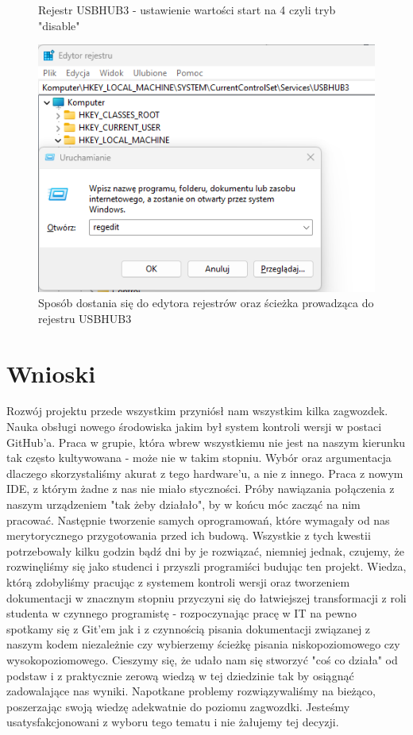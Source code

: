 \documentclass{article}
\begin{document}
\begin{itemize}
\begin{figure}[h]
    \caption{Rejestr USBHUB3 - ustawienie wartości start na 4 czyli tryb "disable"}
    \label{fig:enter-label}
    \end{figure}
    \begin{figure}[h]
    \centering
    \includegraphics[scale=0.5]{Media/Rejestr1.png}
    \caption{Sposób dostania się do edytora rejestrów oraz ścieżka prowadząca do rejestru USBHUB3}
    \label{fig:enter-label}
    \end{figure}
    \end{itemize} 
    
        

\section{Wnioski}
    Rozwój projektu przede wszystkim przyniósł nam wszystkim kilka zagwozdek. Nauka obsługi nowego środowiska jakim był system kontroli wersji w postaci GitHub'a. Praca w grupie, która wbrew wszystkiemu nie jest na naszym kierunku tak często kultywowana - może nie w takim stopniu. Wybór oraz argumentacja dlaczego skorzystaliśmy akurat z tego hardware'u, a nie z innego. Praca z nowym IDE, z którym żadne z nas nie miało styczności. Próby nawiązania połączenia z naszym urządzeniem "tak żeby działało", by w końcu móc zacząć na nim pracować. Następnie tworzenie samych oprogramowań, które wymagały od nas merytorycznego przygotowania przed ich budową. Wszystkie z tych kwestii potrzebowały kilku godzin bądź dni by je rozwiązać, niemniej jednak, czujemy, że rozwinęliśmy się jako studenci i przyszli programiści budując ten projekt. Wiedza, którą zdobyliśmy pracując z systemem kontroli wersji oraz tworzeniem dokumentacji w znacznym stopniu przyczyni się do łatwiejszej transformacji z roli studenta w czynnego programistę - rozpoczynając pracę w IT na pewno spotkamy się z Git'em jak i z czynnością pisania dokumentacji związanej z naszym kodem niezależnie czy wybierzemy ścieżkę pisania niskopoziomowego czy wysokopoziomowego. Cieszymy się, że udało nam się stworzyć "coś co działa" od podstaw i z praktycznie zerową wiedzą w tej dziedzinie tak by osiągnąć zadowalające nas wyniki. Napotkane problemy rozwiązywaliśmy na bieżąco, poszerzając swoją wiedzę adekwatnie do poziomu zagwozdki. Jesteśmy usatysfakcjonowani z wyboru tego tematu i nie żałujemy tej decyzji.
\end{document}
